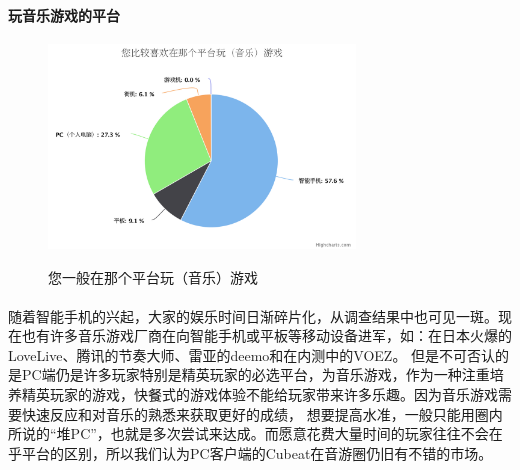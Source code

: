 \documentclass{article}
\begin{document}
\paragraph{玩音乐游戏的平台}
\begin{figure}[H]
  \centering
  \includegraphics[width=22em]{chart2.png}\\
  \caption{您一般在那个平台玩（音乐）游戏}\label{2-2}
\end{figure}
\paragraph{}
随着智能手机的兴起，大家的娱乐时间日渐碎片化，从调查结果中也可见一斑。现在也有许多音乐游戏厂商在向智能手机或平板等移动设备进军，如：在日本火爆的LoveLive、腾讯的节奏大师、雷亚的deemo和在内测中的VOEZ。
但是不可否认的是PC端仍是许多玩家特别是精英玩家的必选平台，为音乐游戏，作为一种注重培养精英玩家的游戏，快餐式的游戏体验不能给玩家带来许多乐趣。因为音乐游戏需要快速反应和对音乐的熟悉来获取更好的成绩，
想要提高水准，一般只能用圈内所说的“堆PC”，也就是多次尝试来达成。而愿意花费大量时间的玩家往往不会在乎平台的区别，所以我们认为PC客户端的Cubeat在音游圈仍旧有不错的市场。
\end{document}
